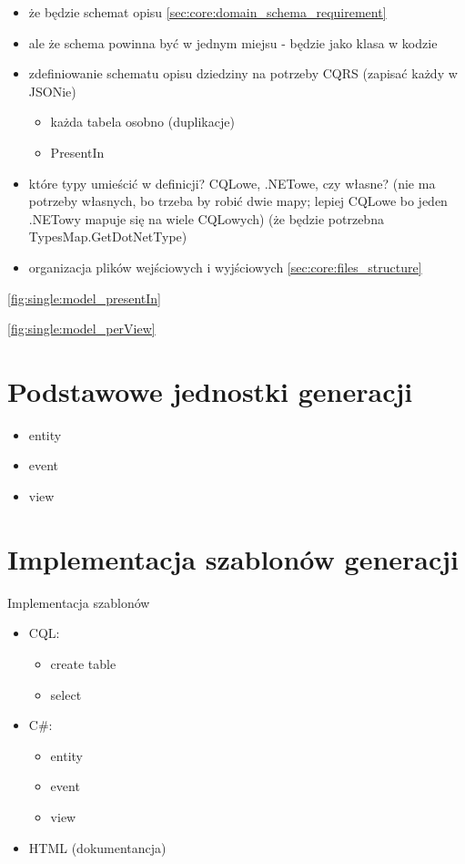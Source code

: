 \begin{itemize}
 \item że będzie schemat opisu \ref{sec:core:domain_schema_requirement}
 \item ale że schema powinna być w jednym miejsu - będzie jako klasa w kodzie
 \item zdefiniowanie schematu opisu dziedziny na potrzeby CQRS (zapisać każdy w JSONie)
  \begin{itemize}
   \item każda tabela osobno (duplikacje)
   \item PresentIn
  \end{itemize}
 \item które typy umieścić w definicji? CQLowe, .NETowe, czy własne? (nie ma potrzeby własnych, bo trzeba by robić dwie mapy; lepiej CQLowe bo jeden .NETowy mapuje się na wiele CQLowych) (że będzie potrzebna TypesMap.GetDotNetType)
 \item organizacja plików wejściowych i wyjściowych \ref{sec:core:files_structure}
\end{itemize}

\ref{fig:single:model_presentIn}


\ref{fig:single:model_perView}



\section{Podstawowe jednostki generacji}

\begin{itemize}
 \item entity
 \item event
 \item view
\end{itemize}



\section{Implementacja szablonów generacji}

Implementacja szablonów

\begin{itemize}
 \item CQL:
  \begin{itemize}
   \item create table
   \item select
  \end{itemize}
 \item C\#:
  \begin{itemize}
   \item entity
   \item event
   \item view
  \end{itemize}
 \item HTML (dokumentancja)
\end{itemize}


